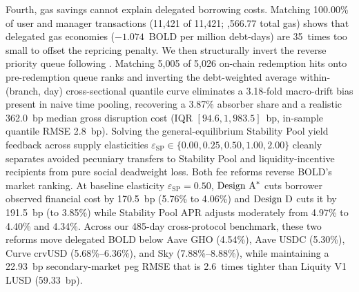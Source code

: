 Fourth, gas savings cannot explain delegated borrowing costs. Matching 100.00\% of user and manager transactions (11,421 of 11,421; ,566.77 total gas) shows that delegated gas economies ($-1.074$~BOLD per million debt-days) are 35~times too small to offset the repricing penalty. We then structurally invert the reverse priority queue following \citet{guerre2000optimal}. Matching 5,005 of 5,026 on-chain redemption hits onto pre-redemption queue ranks and inverting the debt-weighted average within-(branch, day) cross-sectional quantile curve eliminates a 3.18-fold macro-drift bias present in naive time pooling, recovering a 3.87\% absorber share and a realistic 362.0~bp median gross disruption cost (IQR $[94.6, 1{,}983.5]$~bp, in-sample quantile RMSE 2.8~bp). Solving the general-equilibrium Stability Pool yield feedback across supply elasticities $\varepsilon_{\text{SP}} \in \{0.00, 0.25, 0.50, 1.00, 2.00\}$ cleanly separates avoided pecuniary transfers to Stability Pool and liquidity-incentive recipients from pure social deadweight loss. Both fee reforms reverse BOLD's market ranking. At baseline elasticity $\varepsilon_{\text{SP}} = 0.50$, $\text{Design A}^*$ cuts borrower observed financial cost by 170.5~bp (5.76\% to 4.06\%) and $\text{Design D}$ cuts it by 191.5~bp (to 3.85\%) while Stability Pool APR adjusts moderately from 4.97\% to 4.40\% and 4.34\%. Across our 485-day cross-protocol benchmark, these two reforms move delegated BOLD below Aave GHO (4.54\%), Aave USDC (5.30\%), Curve crvUSD (5.68\%--6.36\%), and Sky (7.88\%--8.88\%), while maintaining a 22.93~bp secondary-market peg RMSE that is 2.6~times tighter than Liquity V1 LUSD (59.33~bp).

